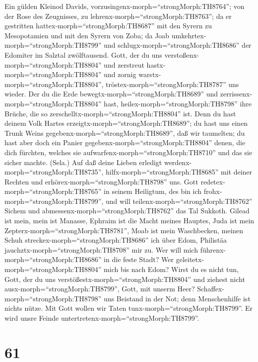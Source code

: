  Ein gülden Kleinod Davids,
vorzusingenx-morph=``strongMorph:TH8764''; von der Rose des Zeugnisses,
zu lehrenx-morph=``strongMorph:TH8763''; da er gestritten
hattex-morph=``strongMorph:TH8687'' mit den Syrern zu Mesopotamien und
mit den Syrern von Zoba; da Joab umkehrtex-morph=``strongMorph:TH8799''
und schlugx-morph=``strongMorph:TH8686'' der Edomiter im Salztal
zwölftausend. Gott, der du uns verstoßenx-morph=``strongMorph:TH8804''
und zerstreut hastx-morph=``strongMorph:TH8804'' und zornig
warstx-morph=``strongMorph:TH8804'',
tröstex-morph=``strongMorph:TH8787'' uns wieder.  Der du die
Erde bewegtx-morph=``strongMorph:TH8689'' und
zerrissenx-morph=``strongMorph:TH8804'' hast,
heilex-morph=``strongMorph:TH8798'' ihre Brüche, die so
zerschelltx-morph=``strongMorph:TH8804'' ist.  Denn du hast
deinem Volk Hartes erzeigtx-morph=``strongMorph:TH8689''; du hast uns
einen Trunk Weins gegebenx-morph=``strongMorph:TH8689'', daß wir
taumelten;  du hast aber doch ein Panier
gegebenx-morph=``strongMorph:TH8804'' denen, die dich fürchten, welches
sie aufwarfenx-morph=``strongMorph:TH8710'' und das sie sicher machte.
(Sela.)  Auf daß deine Lieben erledigt
werdenx-morph=``strongMorph:TH8735'', hilfx-morph=``strongMorph:TH8685''
mit deiner Rechten und erhörex-morph=``strongMorph:TH8798'' uns.
 Gott redetex-morph=``strongMorph:TH8765'' in seinem
Heiligtum, des bin ich frohx-morph=``strongMorph:TH8799'', und will
teilenx-morph=``strongMorph:TH8762'' Sichem und
abmessenx-morph=``strongMorph:TH8762'' das Tal Sukkoth. 
Gilead ist mein, mein ist Manasse, Ephraim ist die Macht meines Hauptes,
Juda ist mein Zepterx-morph=``strongMorph:TH8781'',  Moab
ist mein Waschbecken, meinen Schuh streckex-morph=``strongMorph:TH8686''
ich über Edom, Philistäa jauchztx-morph=``strongMorph:TH8708'' mir zu.
 Wer will mich führenx-morph=``strongMorph:TH8686'' in die
feste Stadt? Wer geleitetx-morph=``strongMorph:TH8804'' mich bis nach
Edom?  Wirst du es nicht tun, Gott, der du uns
verstößestx-morph=``strongMorph:TH8804'' und ziehest nicht
ausx-morph=``strongMorph:TH8799'', Gott, mit unserm Heer? 
Schaffex-morph=``strongMorph:TH8798'' uns Beistand in der Not; denn
Menschenhilfe ist nichts nütze.  Mit Gott wollen wir Taten
tunx-morph=``strongMorph:TH8799''. Er wird unsre Feinde
untertretenx-morph=``strongMorph:TH8799''.

\hypertarget{section-60}{%
\section{61}\label{section-60}}

